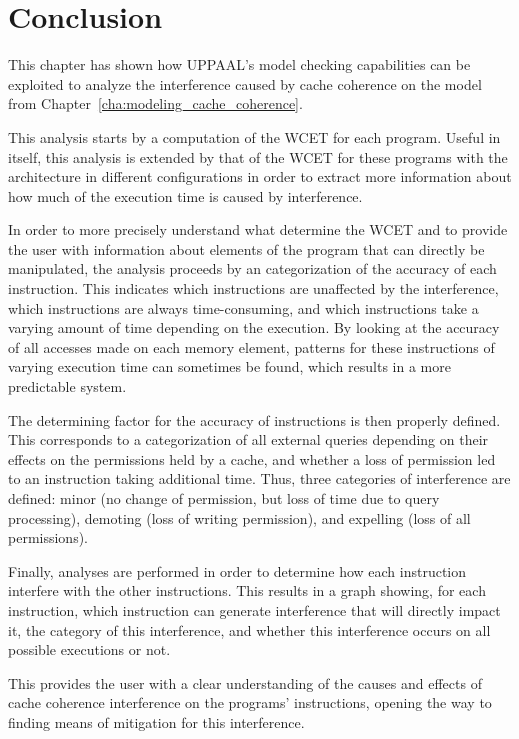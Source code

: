 \section{Conclusion}
This chapter has shown how UPPAAL's model checking capabilities can be exploited
to analyze the interference caused by cache coherence on the model from
Chapter~\ref{cha:modeling_cache_coherence}.

This analysis starts by a computation of the WCET for each program. Useful in
itself, this analysis is extended by that of the WCET for these programs with
the architecture in different configurations in order to extract more
information about how much of the execution time is caused by interference.

In order to more precisely understand what determine the WCET and to provide
the user with information about elements of the program that can directly be
manipulated, the analysis proceeds by an categorization of the accuracy of each
instruction. This indicates which instructions are unaffected by the
interference, which instructions are always time-consuming, and which
instructions take a varying amount of time depending on the execution. By
looking at the accuracy of all accesses made on each memory element, patterns
for these instructions of varying execution time can sometimes be found, which
results in a more predictable system.

The determining factor for the accuracy of instructions is then properly
defined. This corresponds to a categorization of all external queries depending
on their effects on the permissions held by a cache, and whether a loss of
permission led to an instruction taking additional time. Thus, three categories
of interference are defined: minor (no change of permission, but loss of time
due to query processing), demoting (loss of writing permission), and expelling
(loss of all permissions).

Finally, analyses are performed in order to determine how each instruction
interfere with the other instructions. This results in a graph showing, for
each instruction, which instruction can generate interference that will
directly impact it, the category of this interference, and whether this
interference occurs on all possible executions or not.

This provides the user with a clear understanding of the causes and effects of
cache coherence interference on the programs' instructions, opening the way to
finding means of mitigation for this interference.
